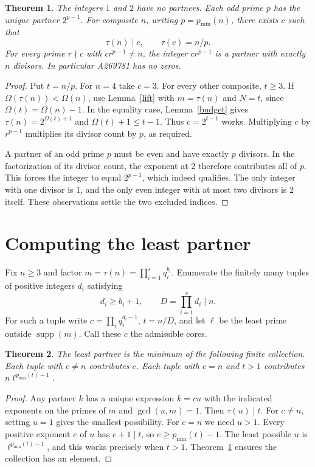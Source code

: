 \documentclass[11pt]{article}
\newtheorem{theorem}{Theorem}[section]
\newcommand{\supp}{\operatorname{supp}}
\newcommand{\least}{p_{\min}}
\begin{document}
\begin{theorem}\label{exist}
The integers $1$ and $2$ have no partners. Each odd prime $p$ has the unique partner $2^{p-1}$. For composite $n$, writing $p=\least(n)$, there exists $c$ such that
\[
   \tau(n)\mid c,\qquad \tau(c)=n/p.
\]
For every prime $r\nmid c$ with $cr^{p-1}\ne n$, the integer $cr^{p-1}$ is a partner with exactly $n$ divisors. In particular A269781 has no zeros.
\end{theorem}
\begin{proof}
Put $t=n/p$. For $n=4$ take $c=3$. For every other composite, $t\ge3$. If $\Omega(\tau(n))<\Omega(n)$, use Lemma~\ref{lift} with $m=\tau(n)$ and $N=t$, since $\Omega(t)=\Omega(n)-1$. In the equality case, Lemma~\ref{budget} gives $\tau(n)=2^{\Omega(t)+1}$ and $\Omega(t)+1\le t-1$. Thus $c=2^{t-1}$ works. Multiplying $c$ by $r^{p-1}$ multiplies its divisor count by $p$, as required.

A partner of an odd prime $p$ must be even and have exactly $p$ divisors. In the factorization of its divisor count, the exponent at $2$ therefore contributes all of $p$. This forces the integer to equal $2^{p-1}$, which indeed qualifies. The only integer with one divisor is $1$, and the only even integer with at most two divisors is $2$ itself. These observations settle the two excluded indices.
\end{proof}

\section{Computing the least partner}
Fix $n\ge3$ and factor $m=\tau(n)=\prod_{i=1}^s q_i^{b_i}$. Enumerate the finitely many tuples of positive integers $d_i$ satisfying
\[
 d_i\ge b_i+1,\qquad D=\prod_{i=1}^s d_i\mid n.
\]
For such a tuple write $c=\prod_i q_i^{d_i-1}$, $t=n/D$, and let $\ell$ be the least prime outside $\supp(m)$. Call these $c$ the admissible cores.

\begin{theorem}\label{min}
The least partner is the minimum of the following finite collection. Each tuple with $c\ne n$ contributes $c$. Each tuple with $c=n$ and $t>1$ contributes $n\ell^{\least(t)-1}$.
\end{theorem}
\begin{proof}
Any partner $k$ has a unique expression $k=cu$ with the indicated exponents on the primes of $m$ and $\gcd(u,m)=1$. Then $\tau(u)\mid t$. For $c\ne n$, setting $u=1$ gives the smallest possibility. For $c=n$ we need $u>1$. Every positive exponent $e$ of $u$ has $e+1\mid t$, so $e\ge\least(t)-1$. The least possible $u$ is $\ell^{\least(t)-1}$, and this works precisely when $t>1$. Theorem~\ref{exist} ensures the collection has an element.
\end{proof}
\end{document}
